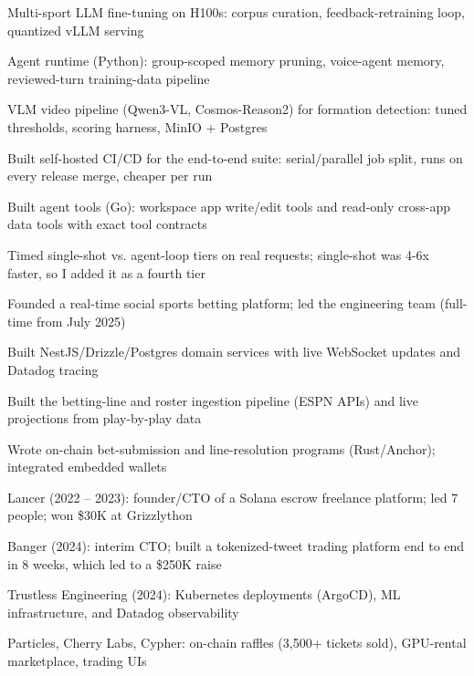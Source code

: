 \documentclass[print]{jack-resume}
\begin{document}
\begin{tightemize}
    \item Multi-sport LLM fine-tuning on H100s: corpus curation, feedback-retraining loop, quantized vLLM serving
    \item Agent runtime (Python): group-scoped memory pruning, voice-agent memory, reviewed-turn training-data pipeline
    \item VLM video pipeline (Qwen3-VL, Cosmos-Reason2) for formation detection: tuned thresholds, scoring harness, MinIO + Postgres
    \item Built self-hosted CI/CD for the end-to-end suite: serial/parallel job split, runs on every release merge, cheaper per run
    \item Built agent tools (Go): workspace app write/edit tools and read-only cross-app data tools with exact tool contracts
    \item Timed single-shot vs. agent-loop tiers on real requests; single-shot was 4-6x faster, so I added it as a fourth tier
\end{tightemize}
\sectionsep

\begin{tightemize}
    \item Founded a real-time social sports betting platform; led the engineering team (full-time from July 2025)
    \item Built NestJS/Drizzle/Postgres domain services with live WebSocket updates and Datadog tracing
    \item Built the betting-line and roster ingestion pipeline (ESPN APIs) and live projections from play-by-play data
    \item Wrote on-chain bet-submission and line-resolution programs (Rust/Anchor); integrated embedded wallets
\end{tightemize}
\sectionsep

\begin{tightemize}
    \item Lancer (2022 – 2023): founder/CTO of a Solana escrow freelance platform; led 7 people; won \$30K at Grizzlython
    \item Banger (2024): interim CTO; built a tokenized-tweet trading platform end to end in 8 weeks, which led to a \$250K raise
    \item Trustless Engineering (2024): Kubernetes deployments (ArgoCD), ML infrastructure, and Datadog observability
    \item Particles, Cherry Labs, Cypher: on-chain raffles (3,500+ tickets sold), GPU-rental marketplace, trading UIs
\end{tightemize}
\sectionsep
\end{document}
